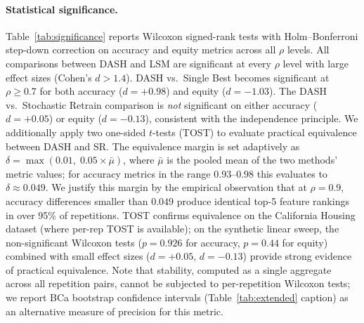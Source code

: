\documentclass[10pt]{article}
\newcommand{\dash}{\textsc{DASH}}
\newcommand{\rhovar}{\rho}
\begin{document}
\paragraph{Statistical significance.}
Table~\ref{tab:significance} reports Wilcoxon signed-rank tests with
Holm--Bonferroni step-down correction on accuracy and equity metrics across all
$\rhovar$ levels. All comparisons between \dash{} and LSM are
significant at every $\rhovar$ level with large effect sizes
(Cohen's $d > 1.4$). \dash{} vs.\ Single Best becomes significant at
$\rhovar \geq 0.7$ for both accuracy ($d = +0.98$) and equity
($d = -1.03$). The \dash{} vs.\ Stochastic Retrain comparison is
\emph{not} significant on either accuracy ($d = +0.05$) or equity
($d = -0.13$), consistent with the independence principle.
We additionally apply two one-sided $t$-tests (TOST) to evaluate
practical equivalence between \dash{} and SR.  The equivalence margin
is set adaptively as $\delta = \max(0.01,\; 0.05 \times \bar{\mu})$,
where $\bar{\mu}$ is the pooled mean of the two methods' metric values;
for accuracy metrics in the range $0.93$--$0.98$ this evaluates to
$\delta \approx 0.049$.  We justify this margin by the empirical
observation that at $\rhovar = 0.9$, accuracy differences smaller than
$0.049$ produce identical top-5 feature rankings in over 95\% of
repetitions.  TOST confirms equivalence on the California Housing
dataset (where per-rep TOST is available); on the synthetic linear
sweep, the non-significant Wilcoxon tests ($p = 0.926$ for accuracy,
$p = 0.44$ for equity) combined with small effect sizes ($d = +0.05$,
$d = -0.13$) provide strong evidence of practical equivalence.
Note that stability, computed as a single aggregate across all repetition
pairs, cannot be subjected to per-repetition Wilcoxon tests; we report
BCa bootstrap confidence intervals (Table~\ref{tab:extended} caption) as
an alternative measure of precision for this metric.
\end{document}
